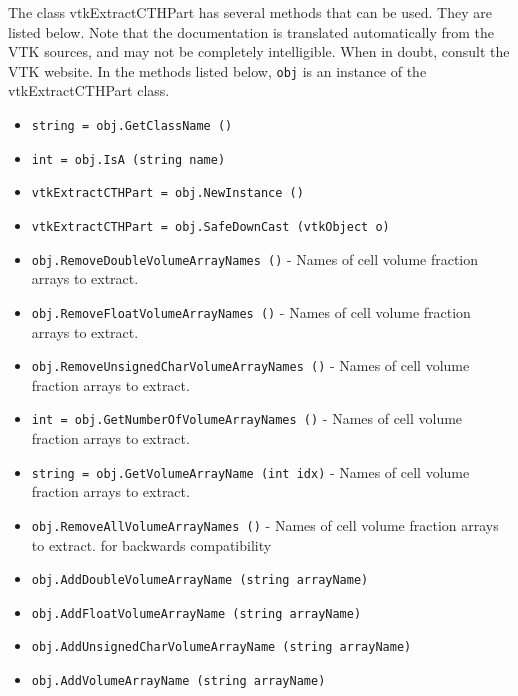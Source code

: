 The class vtkExtractCTHPart has several methods that can be used.
  They are listed below.
Note that the documentation is translated automatically from the VTK sources,
and may not be completely intelligible.  When in doubt, consult the VTK website.
In the methods listed below, \verb|obj| is an instance of the vtkExtractCTHPart class.
\begin{itemize}
\item  \verb|string = obj.GetClassName ()|

\item  \verb|int = obj.IsA (string name)|

\item  \verb|vtkExtractCTHPart = obj.NewInstance ()|

\item  \verb|vtkExtractCTHPart = obj.SafeDownCast (vtkObject o)|

\item  \verb|obj.RemoveDoubleVolumeArrayNames ()| -  Names of cell volume fraction arrays to extract.

\item  \verb|obj.RemoveFloatVolumeArrayNames ()| -  Names of cell volume fraction arrays to extract.

\item  \verb|obj.RemoveUnsignedCharVolumeArrayNames ()| -  Names of cell volume fraction arrays to extract.

\item  \verb|int = obj.GetNumberOfVolumeArrayNames ()| -  Names of cell volume fraction arrays to extract.

\item  \verb|string = obj.GetVolumeArrayName (int idx)| -  Names of cell volume fraction arrays to extract.

\item  \verb|obj.RemoveAllVolumeArrayNames ()| -  Names of cell volume fraction arrays to extract.
 for backwards compatibility

\item  \verb|obj.AddDoubleVolumeArrayName (string arrayName)|

\item  \verb|obj.AddFloatVolumeArrayName (string arrayName)|

\item  \verb|obj.AddUnsignedCharVolumeArrayName (string arrayName)|

\item  \verb|obj.AddVolumeArrayName (string arrayName)|


\end{itemize}
